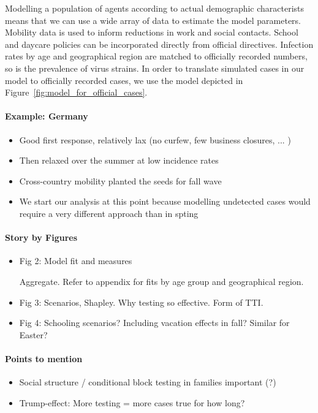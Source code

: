 Modelling a population of agents according to actual demographic characterists means that we can use a wide array of data to estimate the model parameters. Mobility data is used to inform reductions in work and social contacts. School and daycare policies can be incorporated directly from official directives. Infection rates by age and geographical region are matched to officially recorded numbers, so is the prevalence of virus strains. In order to translate simulated cases in our model to officially recorded cases, we use the model depicted in Figure~\ref{fig:model_for_official_cases}. 


\paragraph{Example: Germany}
\begin{itemize}
    \item Good first response, relatively lax (no curfew, few business closures, ... )
    \item Then relaxed over the summer at low incidence rates
    \item Cross-country mobility planted the seeds for fall wave
    \item We start our analysis at this point because modelling undetected cases would require a very different approach than in spting
\end{itemize}



\paragraph{Story by Figures}
\begin{itemize}
    \item Fig 2: Model fit and measures

          Aggregate. Refer to appendix for fits by age group and geographical region.

    \item Fig 3: Scenarios, Shapley. Why testing so effective. Form of TTI.

    \item Fig 4: Schooling scenarios? Including vacation effects in fall? Similar for Easter?

\end{itemize}

\paragraph{Points to mention}
\begin{itemize}
    \item Social structure / conditional block testing in families important (?)
    \item Trump-effect: More testing = more cases true for how long?
\end{itemize}

